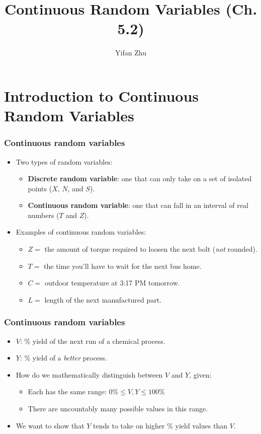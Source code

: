 \documentclass[handout]{beamer}\usepackage[]{graphicx}\usepackage[]{color}
\title{Continuous Random Variables (Ch. 5.2)}
\author{Yifan Zhu}
\date{}
\institute{Iowa State University}
\numberwithin{equation}{section}
\begin{document}
\begin{frame}
\titlepage
 \end{frame}
 

\section{Introduction to Continuous Random Variables}

\begin{frame}
\frametitle{Continuous random variables}
\begin{itemize}
\pause \item Two types of random variables:
\begin{itemize}
\pause \item {\bf Discrete random variable}: one that can only take on a set of isolated points ($X$, $N$, and $S$).
\pause \item {\bf Continuous random variable}: one that can fall in an interval of real numbers ($T$ and $Z$). 
\end{itemize}
\pause \item Examples of continuous random variables:
\begin{itemize}
\pause \item $Z = $ the amount of torque required to loosen the next bolt (\emph{not} rounded).
\pause \item $T = $ the time you'll have to wait for the next bus home.
\pause \item $C = $ outdoor temperature at 3:17 PM tomorrow.
\pause \item $L =$ length of the next manufactured part.
\end{itemize}
\end{itemize}
\end{frame}



\begin{frame}
\frametitle{Continuous random variables}

\begin{itemize}
\pause \item $V$: \% yield of the next run of a chemical process.
\pause \item $Y$: \% yield of a \emph{better} process.
\pause \item How do we mathematically distinguish between $V$ and $Y$, given:
\begin{itemize}
\pause \item Each has the same range: $0\% \le V, Y \le 100\%$
\pause \item There are uncountably many possible values in this range.
\end{itemize} 
\pause \item We want to show that $Y$ tends to take on higher \% yield values than $V$.
\end{itemize}
\end{frame}
\end{document}
